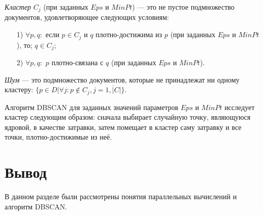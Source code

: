 \textit{Кластер} $C_j$ (при заданных $Eps$ и $MinPt$) --- это не пустое подмножество документов, удовлетворяющее следующих условиям:
\begin{enumerate}
	\item[1)] $\forall p, q:$ если $p \in C_j$ и $q$ плотно-достижима из $p$ (при заданных $Eps$ и $MinPt$), то; $q \in C_j$;
	\item[2)] $\forall p, q:$ $p$ плотно-связана с $q$ (при заданных $Eps$ и $MinPt$).
\end{enumerate}

\textit{Шум} --- это подмножество документов, которые не принадлежат ни одному кластеру: $\{p \in D | \forall j: p \notin C_j, j = \overline{1, |C|}\}$.

Алгоритм DBSCAN для заданных значений параметров $Eps$ и $MinPt$ исследует кластер следующим образом: сначала выбирает случайную точку, являющуюся ядровой, в качестве затравки, затем помещает в кластер саму затравку и все точки, плотно-достижимые из неё.

\section*{Вывод}

В данном разделе были рассмотрены понятия параллельных вычислений и алгоритм DBSCAN.